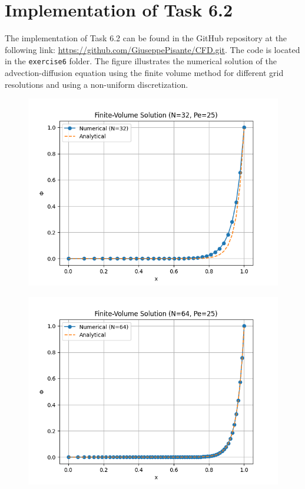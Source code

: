 \documentclass{article}
\begin{document}
\section{Implementation of Task 6.2}
The implementation of Task 6.2 can be found in the GitHub repository at the following link: \url{https://github.com/GiuseppePisante/CFD.git}. 
The code is located in the \texttt{exercise6} folder. The figure illustrates the numerical solution of the advection-diffusion equation using 
the finite volume method for different grid resolutions and using a non-uniform discretization. 

\begin{figure}[h!]
  \centering
  \begin{minipage}{0.32\textwidth}
      \centering
      \includegraphics[width=\textwidth]{FVM_32.png}
      \label{fig:32}
  \end{minipage} \hfill
  \begin{minipage}{0.32\textwidth}
      \centering
      \includegraphics[width=\textwidth]{FVM_64.png}

\end{minipage}
\end{figure}
\end{document}
